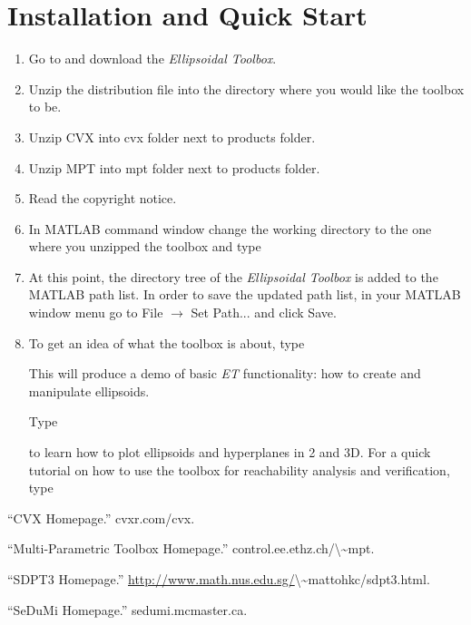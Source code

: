 \documentclass[letterpaper,10pt,english]{sphinxmanual}
\begin{document}
\section{Installation and Quick Start}
\label{chap_install:installation-and-quick-start}\begin{enumerate}
\item {} 
Go to and download the \emph{Ellipsoidal Toolbox}.

\item {} 
Unzip the distribution file into the directory where you would like
the toolbox to be.

\item {} 
Unzip CVX into cvx folder next to products folder.

\item {} 
Unzip MPT into mpt folder next to products folder.

\item {} 
Read the copyright notice.

\item {} 
In MATLAB command window change the working directory to the one
where you unzipped the toolbox and type

\item {} 
At this point, the directory tree of the \emph{Ellipsoidal Toolbox} is
added to the MATLAB path list. In order to save the updated path
list, in your MATLAB window menu go to File $\rightarrow$ Set
Path... and click Save.

\item {} 
To get an idea of what the toolbox is about, type

This will produce a demo of basic \emph{ET} functionality: how to create
and manipulate ellipsoids.

Type

to learn how to plot ellipsoids and hyperplanes in 2 and 3D. For a
quick tutorial on how to use the toolbox for reachability analysis
and verification, type

\end{enumerate}

“CVX Homepage.” cvxr.com/cvx.

“Multi-Parametric Toolbox Homepage.” control.ee.ethz.ch/\textbackslash{}\textasciitilde{}mpt.

“SDPT3 Homepage.” \href{http://www.math.nus.edu.sg/}{http://www.math.nus.edu.sg/}\textbackslash{}\textasciitilde{}mattohkc/sdpt3.html.

“SeDuMi Homepage.” sedumi.mcmaster.ca.
\end{document}
